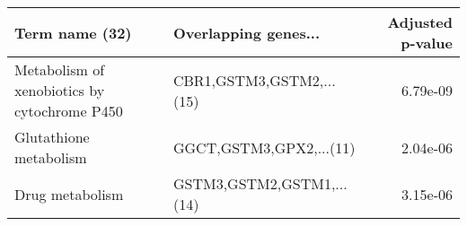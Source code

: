 \begin{tabular}{llr}
\toprule
                              Term name (32) &      Overlapping genes... &  Adjusted p-value \\
\midrule
Metabolism of xenobiotics by cytochrome P450 &  CBR1,GSTM3,GSTM2,...(15) &          6.79e-09 \\
                      Glutathione metabolism &   GGCT,GSTM3,GPX2,...(11) &          2.04e-06 \\
                             Drug metabolism & GSTM3,GSTM2,GSTM1,...(14) &          3.15e-06 \\
\bottomrule
\end{tabular}
